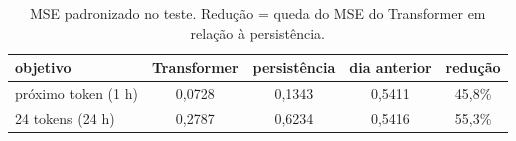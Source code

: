 \begin{table}[!t]
\centering
\caption{MSE padronizado no teste. Redução = queda do MSE do Transformer em relação à persistência.}
\label{tab:teste}
\begin{tabular}{lcccc}
\hline
objetivo & Transformer & persistência & dia anterior & redução \\
\hline
próximo token (1 h) & 0,0728 & 0,1343 & 0,5411 & 45,8\% \\
24 tokens (24 h) & 0,2787 & 0,6234 & 0,5416 & 55,3\% \\
\hline
\end{tabular}
\end{table}